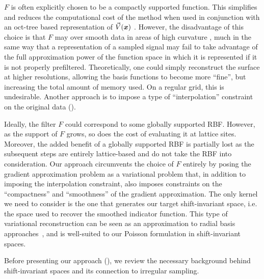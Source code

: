 $F$ is often explicitly chosen to be a compactly supported function. 
This simplifies and reduces the computational cost of the method when used in conjunction with an oct-tree based representation of $\vec{V}(\boldsymbol{x})$ \cite{Kazhdan06}. 
However, the  disadvantage of this choice is that $F$ may over smooth data in areas of high curvature \cite{reconbench}, much in the same way that a representation of a sampled signal may fail to take advantage of the full approximation power of the function space in which it is represented if it is not properly prefiltered. 
Theoretically, one could simply reconstruct the surface at higher resolutions, allowing the basis functions to become more ``fine'', but increasing the total amount of memory used. 
On a regular grid, this is undesirable. 
Another approach is to impose a type of ``interpolation'' constraint on the original data \cite{screenedk} ().

Ideally, the filter $F$ could correspond to some globally supported RBF. 
However, as the support of $F$ grows, so does the cost of evaluating it at lattice sites. 
Moreover, the added benefit of a globally supported RBF is partially lost as the subsequent steps are entirely lattice-based and do not take the RBF into consideration. 
Our approach circumvents the choice of $F$ entirely by posing the gradient approximation problem as a variational problem that, in addition to imposing the interpolation constraint, also imposes constraints on the ``compactness'' and ``smoothness'' of the gradient approximation. 
The only kernel we need to consider is the one that generates our target shift-invariant space, i.e. the space used to recover the smoothed indicator function. 
This type of variational reconstruction can be seen as an approximation to radial basis approaches~\cite{variational}, and is well-suited to our Poisson formulation in shift-invariant spaces.

Before presenting our approach (), we review the necessary background behind shift-invariant spaces and its connection to irregular sampling.

